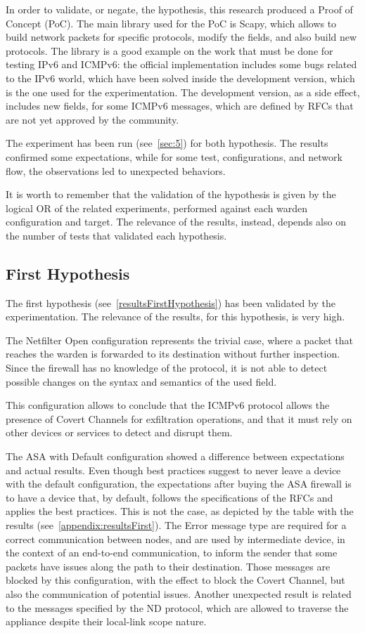 \documentclass[12pt]{article}
\begin{document}
In order to validate, or negate, the hypothesis, this research produced a Proof of Concept (PoC). The main library used for the PoC is Scapy, which allows to build network packets for specific protocols, modify the fields, and also build new protocols. The library is a good example on the work that must be done for testing IPv6 and ICMPv6: the official implementation includes some bugs related to the IPv6 world, which have been solved inside the development version, which is the one used for the experimentation. The development version, as a side effect, includes new fields, for some ICMPv6 messages, which are defined by RFCs that are not yet approved by the community.

The experiment has been run (see~\cref{sec:5}) for both hypothesis. The results confirmed some expectations, while for some test, configurations, and network flow, the observations led to unexpected behaviors.

It is worth to remember that the validation of the hypothesis is given by the logical OR of the related experiments, performed against each warden configuration and target. The relevance of the results, instead, depends also on the number of tests that validated each hypothesis.

\subsection{First Hypothesis}

The first hypothesis (see~\cref{resultsFirstHypothesis}) has been validated by the experimentation. The relevance of the results, for this hypothesis, is very high.

The Netfilter Open configuration represents the trivial case, where a packet that reaches the warden is forwarded to its destination without further inspection. Since the firewall has no knowledge of the protocol, it is not able to detect possible changes on the syntax and semantics of the used field. 

This configuration allows to conclude that the ICMPv6 protocol allows the presence of Covert Channels for exfiltration operations, and that it must rely on other devices or services to detect and disrupt them.

The ASA with Default configuration showed a difference between expectations and actual results. Even though best practices suggest to never leave a device with the default configuration, the expectations after buying the ASA firewall is to have a device that, by default, follows the specifications of the RFCs and applies the best practices. This is not the case, as depicted by the table with the results (see~\cref{appendix:resultsFirst}). The Error message type are required for a correct communication between nodes, and are used by intermediate device, in the context of an end-to-end communication, to inform the sender that some packets have issues along the path to their destination. Those messages are blocked by this configuration, with the effect to block the Covert Channel, but also the communication of potential issues. Another unexpected result is related to the messages specified by the ND protocol, which are allowed to traverse the appliance despite their local-link scope nature.
\end{document}

